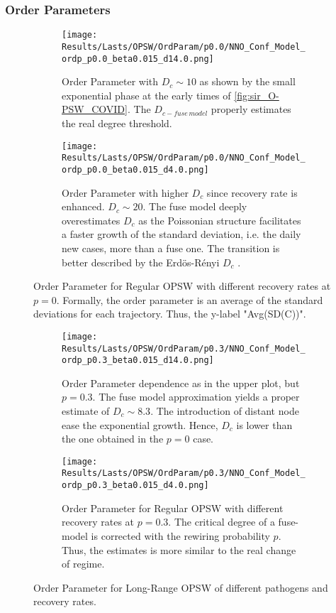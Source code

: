\documentclass[a4paper,10pt,twoside]{book} %
\theoremstyle{definition}
\begin{document}
\subsubsection*{Order Parameters}
\begin{figure}[t]
	\begin{subfigure}[t]{0.48\linewidth}
		\centering
		\texttt{[image: Results/Lasts/OPSW/OrdParam/p0.0/NNO\_Conf\_Model\_ordp\_p0.0\_beta0.015\_d14.0.png]} 
		\caption{Order Parameter with $D_c \sim 10$ as shown by the small exponential phase at the early times of \autoref{fig:sir_O-PSW_COVID}. The $ D_{c-fuse\, model}$ properly estimates the real degree threshold.}
		\label{fig:Ordp_OPSW_COVID19_D14}
	\end{subfigure}
	\hfill
	\begin{subfigure}[t]{0.48\linewidth}
		\centering
		\texttt{[image: Results/Lasts/OPSW/OrdParam/p0.0/NNO\_Conf\_Model\_ordp\_p0.0\_beta0.015\_d4.0.png]}
		\caption{Order Parameter with higher $D_c$ since recovery rate is enhanced. $D_c \sim 20$.
		The fuse model deeply overestimates $ D_c$ as the Poissonian structure facilitates a faster growth of the standard deviation, i.e. the daily new cases, more than a fuse one. The transition is better described by the Erdös-Rényi $ D_c$ .}
		\label{fig:Ordp_OPSW_highmu_COVID19}
	\end{subfigure}
	\caption{Order Parameter for Regular OPSW with different recovery rates at $p = 0$. Formally, the order parameter is an average of the standard deviations for each trajectory. Thus, the y-label "Avg(SD(C))".}
	\label{fig:Ordp_OPSW_COVID19_panel}
\end{figure}

\begin{figure}[t]
	\begin{subfigure}[t]{0.48\linewidth}
		\texttt{[image: Results/Lasts/OPSW/OrdParam/p0.3/NNO\_Conf\_Model\_ordp\_p0.3\_beta0.015\_d14.0.png]}
		\caption{Order Parameter dependence as in the upper plot, but $ p = 0.3$. The fuse model approximation yields a proper estimate of $ D_c \sim 8.3$. The introduction of distant node ease the exponential growth. Hence, $ D_c$ is lower than the one obtained in the $ p = 0$ case.}
		\label{fig:Ordp_OPSW_Dc8.3_p0.3}
	\end{subfigure}
	\hfill
	\begin{subfigure}[t]{0.48\linewidth}
		\texttt{[image: Results/Lasts/OPSW/OrdParam/p0.3/NNO\_Conf\_Model\_ordp\_p0.3\_beta0.015\_d4.0.png]}
		\caption{Order Parameter for Regular OPSW with different recovery rates at $p = 0.3$.
		The critical degree of a fuse-model is corrected with the rewiring probability $ p$. Thus, the estimates is more similar to the real change of regime.}
		\label{fig:Ordp_OPSW_highmu_p0.3}
	\end{subfigure}
	\caption{Order Parameter for Long-Range OPSW of different pathogens and recovery rates.}
	\label{fig:Ordp_OPSW_COVID19_p0.3_panel}
\end{figure}
\end{document}
